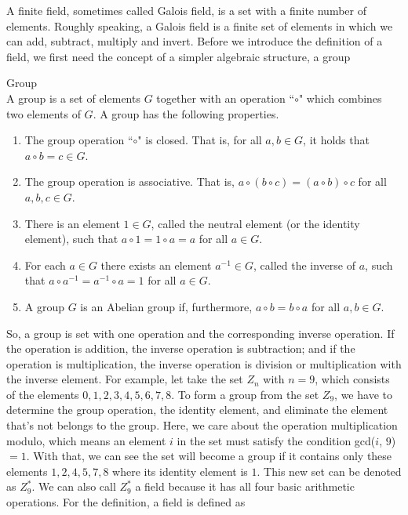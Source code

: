 A finite field, sometimes called Galois field, is a set with a finite number of elements. Roughly speaking, a Galois field is a finite set of elements in which we can add, subtract, multiply and invert. Before we introduce the definition of a field, we first need the concept of a simpler algebraic structure, a group

\begin{mdframed}[align=center, userdefinedwidth=32em]
    \begin{definition} Group\\
    A group is a set of elements $G$ together with an operation ``$\circ$" which combines two elements of $G$. A group has the following properties.
    \begin{enumerate}
      \item The group operation ``$\circ$" is closed. That is, for all $a,b \in G$, it holds that $a \circ b = c \in G$.
      \item The group operation is associative. That is, $a \circ (b \circ c) = (a \circ b) \circ c$ for all $a, b, c \in G$.
      \item There is an element $1 \in G$, called the neutral element (or the identity element), such that $a \circ 1 = 1 \circ a = a$ for all $a \in G$.
      \item For each $a \in G$ there exists an element $a^{-1} \in G$, called the inverse of $a$, such that $a \circ a^{-1} = a^{-1} \circ a = 1$ for all $a \in G$.
      \item A group $G$ is an Abelian group if, furthermore, $a \circ b = b \circ a$ for all $a, b \in G$.
    \end{enumerate}
    \end{definition}
\end{mdframed}

So, a group is set with one operation and the corresponding inverse operation. If the operation is addition, the inverse operation is subtraction; and if the operation is multiplication, the inverse operation is division or multiplication with the inverse element. For example, let take the set $Z_{n}$ with $n = 9$, which consists of the elements ${0, 1, 2, 3, 4, 5, 6, 7, 8}$. To form a group from the set $Z_{9}$, we have to determine the group operation, the identity element, and eliminate the element that's not belongs to the group. Here, we care about the operation multiplication modulo, which means an element $i$ in the set must satisfy the condition gcd($i$, $9$) $= 1$. With that, we can see the set will become a group if it contains only these elements ${1, 2, 4, 5, 7, 8}$ where its identity element is $1$. This new set can be denoted as $Z^{*}_{9}$. We can also call $Z^{*}_{9}$ a field because it has all four basic arithmetic operations. For the definition, a field is defined as

